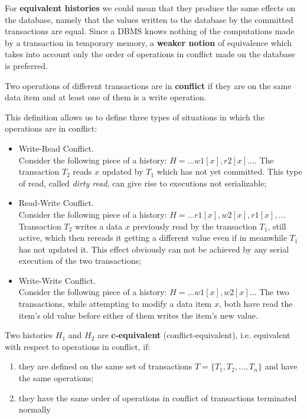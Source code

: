 For \textbf{equivalent histories} we could mean that they produce the same effects on the database, namely that the values written to the database by the committed transactions are equal. Since a DBMS knows nothing of the computations made by a transaction in temporary memory, a \textbf{weaker notion} of equivalence which takes into account only the order of operations in conflict made on the database is preferred.

\begin{tcolorbox}
    Two operations of different transactions are in \textbf{conflict} if they are on the same data item and at least one of them is a write operation.
\end{tcolorbox}

This definition allows us to define three types of situations in which the operations are in conflict:

\begin{itemize}

    \item Write-Read Conflict. \\Consider the following piece of a history: $H = ...w1[x],r2[x]...$. The transaction $T_2$ reads $x$ updated by $T_1$ which has not yet committed. This type of read, called \textit{dirty read}, can give rise to executions not serializable;

    \item Read-Write Conflict. \\Consider the following piece of a history: $H = ...r1[x],w2[x],r1[x],...$ Transaction $T_2$ writes a data $x$ previously read by the transaction $T_1$, still active, which then rereads it getting a different value even if in meanwhile $T_1$ has not updated it. This effect obviously can not be achieved by any serial execution of the two transactions;

    \item Write-Write Conflict. \\Consider the following piece of a history: $H = ...w1[x],w2[x]...$ The two transactions, while attempting to modify a data item $x$, both have read the item’s old value before either of them writes the item’s new value. 
    
\end{itemize}

\begin{tcolorbox}
    Two histories $H_1$ and $H_2$ are \textbf{c-equivalent} (conflict-equivalent), i.e. equivalent with respect to operations in conflict, if:
    
    \begin{enumerate}
        \item they are defined on the same set of transactions $T = \{T_1, T_2, ..., T_n\}$ and have the same operations;
        \item they have the same order of operations in conflict of transactions terminated normally
    \end{enumerate}
    
\end{tcolorbox}

